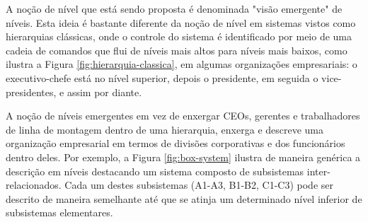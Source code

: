     
    A noção de nível que está sendo proposta é denominada "visão emergente" de níveis. Esta ideia é bastante diferente da noção de nível em sistemas vistos como hierarquias clássicas, onde o controle do sistema é identificado por meio de uma cadeia de comandos que flui de níveis mais altos para níveis mais baixos, como ilustra a Figura \ref{fig:hierarquia-classica}, em algumas organizações empresariais: o executivo-chefe está no nível superior, depois o presidente, em seguida o vice-presidentes, e assim por diante.
    
    
    \begin{figure}[!ht]
        \centering
    \end{figure}
    
    A noção de níveis emergentes em vez de enxergar CEOs, gerentes e trabalhadores de linha de montagem dentro de uma hierarquia, enxerga e descreve uma organização empresarial em termos de divisões corporativas e dos funcionários dentro deles. Por exemplo, a Figura \ref{fig:box-system} ilustra de maneira genérica a descrição em níveis destacando um sistema composto de subsistemas inter-relacionados. Cada um destes subsistemas (A1-A3, B1-B2, C1-C3) pode ser descrito de maneira semelhante até que se atinja um determinado nível inferior de subsistemas elementares.
    
